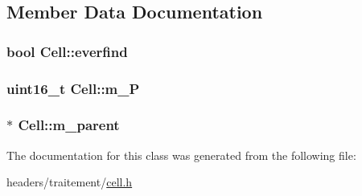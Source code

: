 \subsection{Member Data Documentation}
\hypertarget{class_cell_a1c2a62d76f46eb90b5d128fe30286e51}{
\subsubsection[{everfind}]{\setlength{\rightskip}{0pt plus 5cm}bool Cell\-::everfind}}\label{class_cell_a1c2a62d76f46eb90b5d128fe30286e51}
\hypertarget{class_cell_aa47b258f5356e76a577a5035b6e1cf59}{
\subsubsection[{m\-\_\-\-P}]{\setlength{\rightskip}{0pt plus 5cm}uint16\-\_\-t Cell\-::m\-\_\-\-P}}\label{class_cell_aa47b258f5356e76a577a5035b6e1cf59}
\hypertarget{class_cell_a1d30ec2a94e3ba2bec541d978f55c9bc}{
\subsubsection[{m\-\_\-parent}]{$\ast$ Cell\-::m\-\_\-parent}}\label{class_cell_a1d30ec2a94e3ba2bec541d978f55c9bc}


The documentation for this class was generated from the following file\-:\begin{DoxyCompactItemize}
\item 
headers/traitement/\hyperlink{cell_8h}{cell.\-h}\end{DoxyCompactItemize}
